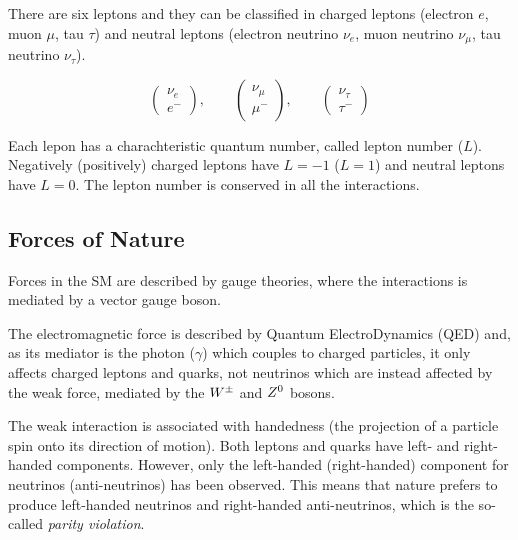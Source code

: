 			There are six leptons and they can be classified in charged leptons (electron $e$, muon $\mu$, tau $\tau$) and neutral leptons (electron neutrino $\nu_e$, muon neutrino $\nu_{\mu}$, tau neutrino $\nu_{\tau}$).

			
			\begin{equation*}
			\label{eq:lepton_flavor_doublets}
				\begin{pmatrix} \nu_e      \\ e^-    \end{pmatrix}, \qquad
				\begin{pmatrix} \nu_{\mu}  \\ \mu^-  \end{pmatrix}, \qquad
				\begin{pmatrix} \nu_{\tau} \\ \tau^- \end{pmatrix}
			\end{equation*}

			\noindent Each lepon has a charachteristic quantum number, called lepton number ($L$). Negatively (positively) charged leptons have $L=-1$ ($L=1$) and neutral leptons have $L=0$. The lepton number is conserved in all the interactions. 



		\subsection*{Forces of Nature}

			Forces in the SM are described by gauge theories, where the interactions is mediated by a vector gauge boson. 

			The electromagnetic force is described by Quantum ElectroDynamics (QED) and, as its mediator is the photon ($\gamma$) which couples to charged particles, it only affects charged leptons and quarks, not neutrinos which are instead affected by the weak force, mediated by the $W^{\pm}$ and $Z^0$ bosons. 

			The weak interaction is associated with handedness (the projection of a particle spin onto its direction of motion). Both leptons and quarks have left- and right-handed components. However, only the left-handed (right-handed) component for neutrinos (anti-neutrinos) has been observed. This means that nature prefers to produce left-handed neutrinos and right-handed anti-neutrinos, which is the so-called \textit{parity violation}. 

